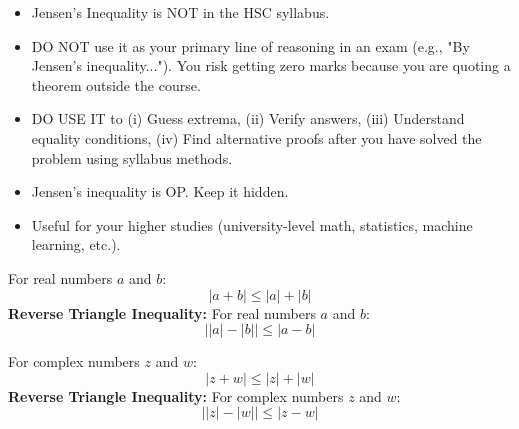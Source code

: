 \documentclass[12pt]{article}
\newenvironment{remark}[1][]{%
  \begin{remarkbox}[title={\bfseries Remark~\thetcbcounter\ifx\relax#1\relax\else\ (#1)\fi}]%
}{%
  \end{remarkbox}%
}
\begin{document}
\begin{remark}
\begin{minipage}[t]{0.49\linewidth}
{%
}
\end{minipage}

\begin{itemize}

  \item Jensen's Inequality is NOT in the HSC syllabus.
  \item DO NOT use it as your primary line of reasoning in an exam (e.g., "By Jensen's inequality..."). You risk getting zero marks because you are quoting a theorem outside the course.
  \item DO USE IT to (i) Guess extrema, (ii) Verify answers, (iii) Understand equality conditions, (iv) Find alternative proofs after you have solved the problem using syllabus methods.
  \item Jensen's inequality is OP. Keep it hidden.
  \item Useful for your higher studies (university-level math, statistics, machine learning, etc.).
\end{itemize}
\end{remark}

\begin{theorembox}[title={\bfseries Triangle Inequality (Real Numbers)}]
For real numbers $a$ and $b$:
\[
|a + b| \le |a| + |b|
\]
\textbf{Reverse Triangle Inequality:} For real numbers $a$ and $b$:
\[
\big||a| - |b|\big| \le |a - b|
\]
\end{theorembox}

\begin{theorembox}[title={\bfseries Triangle Inequality (Complex Numbers)}]
For complex numbers $z$ and $w$:
\[
|z + w| \le |z| + |w|
\]
\textbf{Reverse Triangle Inequality:} For complex numbers $z$ and $w$:
\[
\big||z| - |w|\big| \le |z - w|
\]
\end{theorembox}
\end{document}
